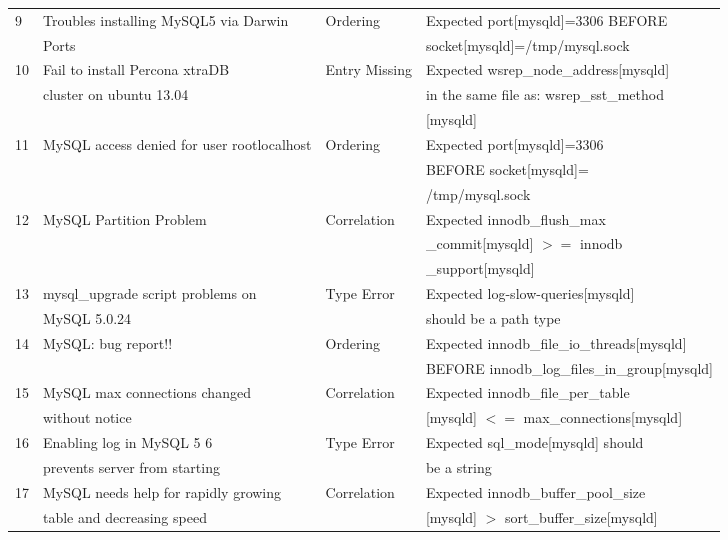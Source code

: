 \begin{table*}[tbp]
\begin{footnotesize}
\begin{tabular}{|l|l|l|l|}
9 & Troubles installing MySQL5 via  Darwin 
& Ordering
& Expected port[mysqld]=3306 BEFORE \\ & Ports
&&  socket[mysqld]=/tmp/mysql.sock \\ \hline

10 & Fail to install Percona xtraDB 
& Entry Missing
& Expected wsrep\_node\_address[mysqld] \\ & cluster on ubuntu 13.04
&&  in the same file as: wsrep\_sst\_method \\ &&& [mysqld] \\ \hline

11 & MySQL access denied for user rootlocalhost 
& Ordering
& Expected port[mysqld]=3306  \\ & &&   BEFORE socket[mysqld]= \\ &&& /tmp/mysql.sock
\\ \hline

12 & MySQL Partition Problem
& Correlation
& Expected innodb\_flush\_max  \\ & &&  \_commit[mysqld] $>=$ innodb \\ &&&  \_support[mysqld] \\ \hline

13 & mysql\_upgrade script problems on 
& Type Error
& Expected log-slow-queries[mysqld]  \\ & MySQL 5.0.24 
&&  should be a path type\\ \hline


14 & MySQL: bug report!!
& Ordering
& Expected innodb\_file\_io\_threads[mysqld]  \\ & 
&& BEFORE innodb\_log\_files\_in\_group[mysqld]\\ \hline

15 & MySQL max connections changed 
& Correlation
& Expected innodb\_file\_per\_table \\ & without notice
&&  [mysqld] $<=$ max\_connections[mysqld]  \\ \hline

16 & Enabling log in MySQL 5 6 
& Type Error
& Expected sql\_mode[mysqld] should  \\ & prevents server from starting
&&  be a string \\ \hline

17 & MySQL needs help for rapidly growing 
& Correlation
& Expected innodb\_buffer\_pool\_size \\ & table and decreasing speed
&&  [mysqld] $>$ sort\_buffer\_size[mysqld] \\ \hline


\end{tabular}
\end{footnotesize}
\end{table*}
